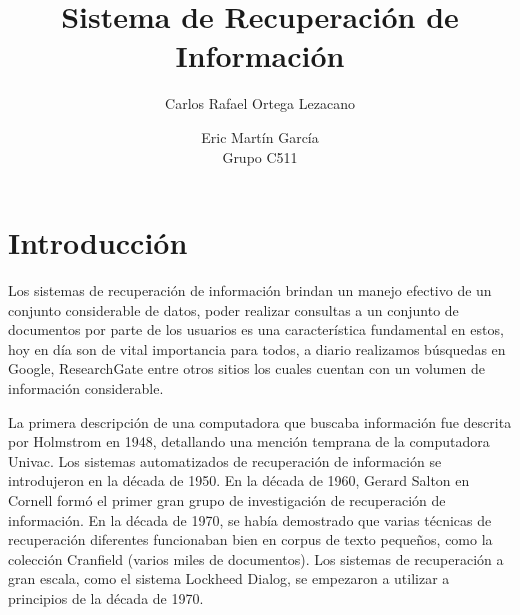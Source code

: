 \documentclass[runningheads,a4paper]{llncs}
\begin{document}
\mainmatter  %

\title{Sistema de Recuperación de Información}


%
%
\author{Carlos Rafael Ortega Lezacano \and Eric Martín García \\ Grupo C511}
%


%
%

\maketitle

\section{Introducción}

Los sistemas de recuperación de información brindan un manejo efectivo de un conjunto considerable de datos, poder realizar consultas a un conjunto de documentos por parte de los usuarios es una característica fundamental en estos, hoy en día son de vital importancia para todos, a diario realizamos búsquedas en Google, ResearchGate entre otros sitios los cuales cuentan con un volumen de información considerable. 

La primera descripción de una computadora que buscaba información fue descrita por Holmstrom en 1948, detallando una mención temprana de la computadora Univac. Los sistemas automatizados de recuperación de información se introdujeron en la década de 1950. En la década de 1960, Gerard Salton en Cornell formó el primer gran grupo de investigación de recuperación de información. En la década de 1970, se había demostrado que varias técnicas de recuperación diferentes funcionaban bien en corpus de texto pequeños, como la colección Cranfield (varios miles de documentos). Los sistemas de recuperación a gran escala, como el sistema Lockheed Dialog, se empezaron a utilizar a principios de la década de 1970. 
\end{document}
